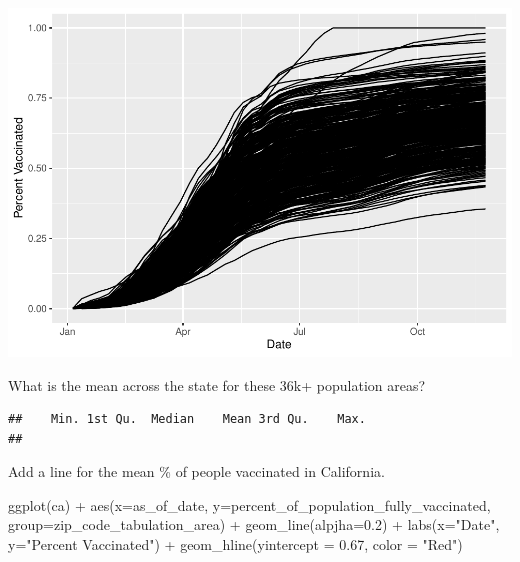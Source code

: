 \documentclass[
]{article}
\newenvironment{Shaded}{\begin{snugshade}}{\end{snugshade}}
\newcommand{\AttributeTok}[1]{\textcolor[rgb]{0.77,0.63,0.00}{#1}}
\newcommand{\FloatTok}[1]{\textcolor[rgb]{0.00,0.00,0.81}{#1}}
\newcommand{\FunctionTok}[1]{\textcolor[rgb]{0.00,0.00,0.00}{#1}}
\newcommand{\NormalTok}[1]{#1}
\newcommand{\OtherTok}[1]{\textcolor[rgb]{0.56,0.35,0.01}{#1}}
\newcommand{\SpecialCharTok}[1]{\textcolor[rgb]{0.00,0.00,0.00}{#1}}
\newcommand{\StringTok}[1]{\textcolor[rgb]{0.31,0.60,0.02}{#1}}
\begin{document}
\includegraphics{Class17_Vax_files/figure-latex/unnamed-chunk-34-1.pdf}

What is the mean across the state for these 36k+ population areas?

\begin{Shaded}
\end{Shaded}

\begin{verbatim}
##    Min. 1st Qu.  Median    Mean 3rd Qu.    Max. 
## 
\end{verbatim}

Add a line for the mean \% of people vaccinated in California.

\begin{Shaded}
\begin{Highlighting}[]
 \FunctionTok{ggplot}\NormalTok{(ca) }\SpecialCharTok{+} 
  \FunctionTok{aes}\NormalTok{(}\AttributeTok{x=}\NormalTok{as\_of\_date, }\AttributeTok{y=}\NormalTok{percent\_of\_population\_fully\_vaccinated, }
      \AttributeTok{group=}\NormalTok{zip\_code\_tabulation\_area) }\SpecialCharTok{+}
  \FunctionTok{geom\_line}\NormalTok{(}\AttributeTok{alpjha=}\FloatTok{0.2}\NormalTok{) }\SpecialCharTok{+}
  \FunctionTok{labs}\NormalTok{(}\AttributeTok{x=}\StringTok{"Date"}\NormalTok{, }\AttributeTok{y=}\StringTok{"Percent Vaccinated"}\NormalTok{) }\SpecialCharTok{+}
  \FunctionTok{geom\_hline}\NormalTok{(}\AttributeTok{yintercept =} \FloatTok{0.67}\NormalTok{, }\AttributeTok{color =} \StringTok{"Red"}\NormalTok{)}
\end{Highlighting}
\end{Shaded}
\end{document}
